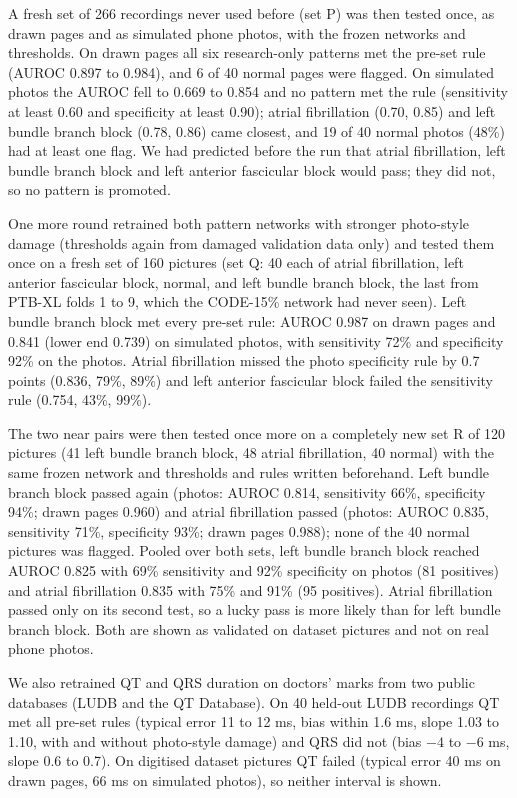 \documentclass[conference]{IEEEtran}
\begin{document}
A fresh set of 266 recordings never used before (set P) was then tested once, as drawn pages and as simulated phone photos, with the frozen networks and thresholds. On drawn pages all six research-only patterns met the pre-set rule (AUROC 0.897 to 0.984), and 6 of 40 normal pages were flagged. On simulated photos the AUROC fell to 0.669 to 0.854 and no pattern met the rule (sensitivity at least 0.60 and specificity at least 0.90); atrial fibrillation (0.70, 0.85) and left bundle branch block (0.78, 0.86) came closest, and 19 of 40 normal photos (48\%) had at least one flag. We had predicted before the run that atrial fibrillation, left bundle branch block and left anterior fascicular block would pass; they did not, so no pattern is promoted.

One more round retrained both pattern networks with stronger photo-style damage (thresholds again from damaged validation data only) and tested them once on a fresh set of 160 pictures (set Q: 40 each of atrial fibrillation, left anterior fascicular block, normal, and left bundle branch block, the last from PTB-XL folds 1 to 9, which the CODE-15\% network had never seen). Left bundle branch block met every pre-set rule: AUROC 0.987 on drawn pages and 0.841 (lower end 0.739) on simulated photos, with sensitivity 72\% and specificity 92\% on the photos. Atrial fibrillation missed the photo specificity rule by 0.7 points (0.836, 79\%, 89\%) and left anterior fascicular block failed the sensitivity rule (0.754, 43\%, 99\%).

The two near pairs were then tested once more on a completely new set R of 120 pictures (41 left bundle branch block, 48 atrial fibrillation, 40 normal) with the same frozen network and thresholds and rules written beforehand. Left bundle branch block passed again (photos: AUROC 0.814, sensitivity 66\%, specificity 94\%; drawn pages 0.960) and atrial fibrillation passed (photos: AUROC 0.835, sensitivity 71\%, specificity 93\%; drawn pages 0.988); none of the 40 normal pictures was flagged. Pooled over both sets, left bundle branch block reached AUROC 0.825 with 69\% sensitivity and 92\% specificity on photos (81 positives) and atrial fibrillation 0.835 with 75\% and 91\% (95 positives). Atrial fibrillation passed only on its second test, so a lucky pass is more likely than for left bundle branch block. Both are shown as validated on dataset pictures and not on real phone photos.

We also retrained QT and QRS duration on doctors' marks from two public databases (LUDB and the QT Database). On 40 held-out LUDB recordings QT met all pre-set rules (typical error 11 to 12 ms, bias within 1.6 ms, slope 1.03 to 1.10, with and without photo-style damage) and QRS did not (bias $-4$ to $-6$ ms, slope 0.6 to 0.7). On digitised dataset pictures QT failed (typical error 40 ms on drawn pages, 66 ms on simulated photos), so neither interval is shown.
\end{document}
